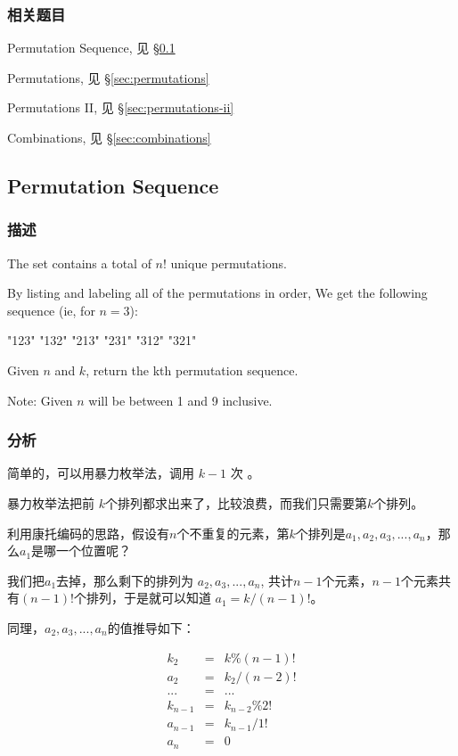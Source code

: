 \subsubsection{相关题目}
\begindot
\item Permutation Sequence, 见 \S \ref{sec:permutation-sequence}
\item Permutations, 见 \S \ref{sec:permutations}
\item Permutations II, 见 \S \ref{sec:permutations-ii}
\item Combinations, 见 \S \ref{sec:combinations}
\myenddot


\subsection{Permutation Sequence} %
\label{sec:permutation-sequence}


\subsubsection{描述}
The set \fn{[1,2,3,…,n]} contains a total of $n!$ unique permutations.

By listing and labeling all of the permutations in order,
We get the following sequence (ie, for $n = 3$):
\begin{Code}
"123"
"132"
"213"
"231"
"312"
"321"
\end{Code}

Given $n$ and $k$, return the kth permutation sequence.

Note: Given $n$ will be between 1 and 9 inclusive.


\subsubsection{分析}
简单的，可以用暴力枚举法，调用 $k-1$ 次 。

暴力枚举法把前 $k$个排列都求出来了，比较浪费，而我们只需要第$k$个排列。

利用康托编码的思路，假设有$n$个不重复的元素，第$k$个排列是$a_1, a_2, a_3, ..., a_n$，那么$a_1$是哪一个位置呢？

我们把$a_1$去掉，那么剩下的排列为
$a_2, a_3, ..., a_n$, 共计$n-1$个元素，$n-1$个元素共有$(n-1)!$个排列，于是就可以知道 $a_1 = k / (n-1)!$。

同理，$a_2, a_3, ..., a_n$的值推导如下：

\begin{eqnarray}
k_2 &=& k\%(n-1)! \nonumber \\
a_2 &=& k_2/(n-2)! \nonumber \\
... &=& ... \nonumber \\
k_{n-1} &=& k_{n-2}\%2! \nonumber \\
a_{n-1} &=& k_{n-1}/1! \nonumber \\
a_n &=& 0 \nonumber
\end{eqnarray}


